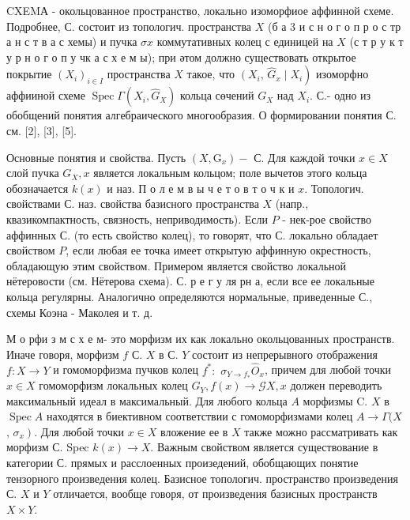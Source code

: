 \documentclass[10pt]{article}
\begin{document}
CXEMА - окольцованное пространство, локально изоморфиое аффинной схеме. Подробнее, С. состоит из топологич. пространства $X$ (б а 3 и с н о г о п р о с тр а н с т в а с хемы) и пучка $\sigma x$ коммутативных колец с единицей на $X$ (с т р у к т у р н о г о п у чк а с х е м ы); при әтом должно существовать открытое покрытие $\left(X_{i}\right)_{i \in I}$ пространства $X$ такое, что $\left(X_{i}\right.$, $\left.\widehat{G}_{x} \mid X_{i}\right)$ изоморфно аффииной схеме $\operatorname{Spec} \Gamma\left(X_{i}, \widehat{G}_{X}\right)$ кольца сөчений $G_{X}$ над $X_{i}$. С.- одно из обобщений понятия алгебраического многообразия. О формировании понятия С. см. [2], [3], [5].



Основные понятия и свойства. Пусть $\left(X, \mathrm{G}_{x}\right)-$ С. Для каждой точки $x \in X$ слой пучка $G_{X}, x$ является локальным кольцом; поле вычетов этого кольца обозначается $k(x)$ и наз. П о л е м в ы ч е т о в т о ч к и $x$. Топологич. свойствами С. наз. свойства базисного пространства $X$ (напр., квазикомпактность, связность, неприводимость). Если $P$ - нек-рое свойство аффинных С. (то есть свойство колец), то говорят, что С. локально обладает свойством $P$, если любая ее точка имеет открытую аффинную окрестность, обладающую этим свойством. Примером является свойство локальной нётеровости (см. Нётерова схема). С. р е г у ля рн а, если все ее локальные кольца регулярны. Аналогично определяются нормальные, приведенные С., схемы Коэна - Маколея и т. д.



М о рфи з м с х е м- это морфизм их как локально окольцованных пространств. Иначе говоря, морфизм $f$ С. $X$ в С. $Y$ состоит из непрерывного отображения $f: X \rightarrow Y$ и гомоморфизма пучков колец $f^{*}:$ $\sigma_{Y \rightarrow f_{*}} \hat{O}_{x}$, причем для любой точки $x \in X$ гомоморфизм локальных колец $G_{Y}, f(x) \rightarrow \mathcal{G} X, x$ должен переводить максимальный идеал в максимальный. Для любого кольца $A$ морфизмы C. $X$ в $\operatorname{Spec} A$ находятся в биективном соответствии с гомоморфизмами колец $A \rightarrow \Gamma(X$, $\left.\sigma_{x}\right)$. Для любой точки $x \in X$ вложение ее в $X$ также можно рассматривать как морфизм С. Spec $k(x) \rightarrow X$. Важным свойством является существование в категории С. прямых и расслоенных произедений, обобщающих понятие тензорного произведения колец. Базисное топологич. пространство произведения С. $X$ и $Y$ отличается, вообще говоря, от произведения базисных пространств $X \times Y$.
\end{document}
